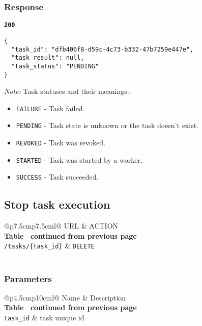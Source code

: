 \subsubsection{Response}
\textbf{\texttt{200}}
\begin{lstlisting}
{
  "task_id": "dfb406f8-d59c-4c73-b332-47b7259e447e",
  "task_result": null,
  "task_status": "PENDING"
}
\end{lstlisting}

\textit{Note:} Task statuses and their meanings::
\begin{itemize}
  \item \texttt{FAILURE} - Task failed.
  \item \texttt{PENDING} - Task state is unknown or the task doesn't exist.
  \item \texttt{REVOKED} - Task was revoked.
  \item \texttt{STARTED} - Task was started by a worker.
  \item \texttt{SUCCESS} - Task succeeded.
\end{itemize}


\subsection{Stop task execution}

\begin{longtable}[c]{@{}p{7.5cm}p{7.5cm}l@{}}
  \toprule
  URL                          & ACTION                       \\* \midrule
  \endfirsthead
  \multicolumn{3}{c}%
  {{\bfseries Table \thetable\ continued from previous page}} \\
  \endhead
  \bottomrule
  \endfoot
  \endlastfoot
  \texttt{/tasks/\{task\_id\}} & \texttt{DELETE}              \\* \bottomrule
  \label{tab:rdf-validator-delete-task}                       \\
\end{longtable}

\subsubsection{Parameters}
\begin{longtable}[c]{@{}p{4.5cm}p{10cm}l@{}}
  \toprule
  Name              & Description                             \\* \midrule
  \endfirsthead
  \multicolumn{3}{c}%
  {{\bfseries Table \thetable\ continued from previous page}} \\
  \endhead
  \bottomrule
  \endfoot
  \endlastfoot
  \texttt{task\_id} & task unique id                          \\* \bottomrule
  \label{tab:rdf-validator-delete-task-parameters}            \\
\end{longtable}

